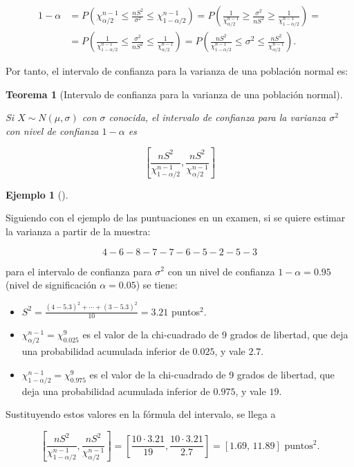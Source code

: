 \documentclass[
  a4paper,
]{scrreport}
\providecommand{\tightlist}{%
  \setlength{\itemsep}{0pt}\setlength{\parskip}{0pt}}\usepackage{longtable,booktabs,array}
\theoremstyle{definition}
\theoremstyle{definition}
\newtheorem{example}{Ejemplo}[chapter]
\theoremstyle{plain}
\newtheorem{theorem}{Teorema}[chapter]
\theoremstyle{remark}
\begin{document}
\begin{align*}
1-\alpha &= P\left(\chi^{n-1}_{\alpha/2}\leq \frac{nS^2}{\sigma^2}  \leq \chi^{n-1}_{1-\alpha/2}\right) =
P\left(\frac{1}{\chi^{n-1}_{\alpha/2}}\geq \frac{\sigma^2}{nS^2}  \geq \frac{1}{\chi^{n-1}_{1-\alpha/2}}\right)=\\
&= P\left(\frac{1}{\chi^{n-1}_{1-\alpha/2}}\leq \frac{\sigma^2}{nS^2}  \leq \frac{1}{\chi^{n-1}_{\alpha/2}}\right)
= P\left(\frac{nS^2}{\chi^{n-1}_{1-\alpha/2}}\leq \sigma^2  \leq \frac{nS^2}{\chi^{n-1}_{\alpha/2}}\right).
\end{align*}

Por tanto, el intervalo de confianza para la varianza de una población
normal es:

\begin{theorem}[Intervalo de confianza para la varianza de una población
normal]\protect\hypertarget{thm-intervalo-confianza-varianza-normal}{}\label{thm-intervalo-confianza-varianza-normal}

Si \(X\sim N(\mu, \sigma)\) con \(\sigma\) conocida, el \emph{intervalo
de confianza para la varianza} \(\sigma^2\) con nivel de confianza
\(1-\alpha\) es

\[
\left[\frac{nS^2}{\chi^{n-1}_{1-\alpha/2}},\frac{nS^2}{\chi^{n-1}_{\alpha/2}}\right]
\]

\end{theorem}

\begin{example}[]\protect\hypertarget{exm-intervalo-confianza-varianza-normal}{}\label{exm-intervalo-confianza-varianza-normal}

Siguiendo con el ejemplo de las puntuaciones en un examen, si se quiere
estimar la varianza a partir de la muestra:

\[
4 - 6 - 8 - 7 - 7 - 6 - 5 - 2 - 5 - 3
\]

para el intervalo de confianza para \(\sigma^2\) con un nivel de
confianza \(1-\alpha=0.95\) (nivel de significación \(\alpha=0.05\)) se
tiene:

\begin{itemize}
\tightlist
\item
  \(S^2= \frac{(4-5.3)^2+\cdots+(3-5.3)^2}{10} = 3.21\) puntos\(^2\).
\item
  \(\chi^{n-1}_{\alpha/2}=\chi^9_{0.025}\) es el valor de la
  chi-cuadrado de 9 grados de libertad, que deja una probabilidad
  acumulada inferior de \(0.025\), y vale \(2.7\).
\item
  \(\chi^{n-1}_{1-\alpha/2}=\chi^9_{0.975}\) es el valor de la
  chi-cuadrado de 9 grados de libertad, que deja una probabilidad
  acumulada inferior de \(0.975\), y vale \(19\).
\end{itemize}

Sustituyendo estos valores en la fórmula del intervalo, se llega a

\[
\left[\frac{nS^2}{\chi^{n-1}_{1-\alpha/2}},\frac{nS^2}{\chi^{n-1}_{\alpha/2}}\right] =
\left[\frac{10\cdot 3.21}{19},\frac{10\cdot 3.21}{2.7}\right] = [1.69,\,11.89] \text{ puntos}^2.
\]

\end{example}
\end{document}

